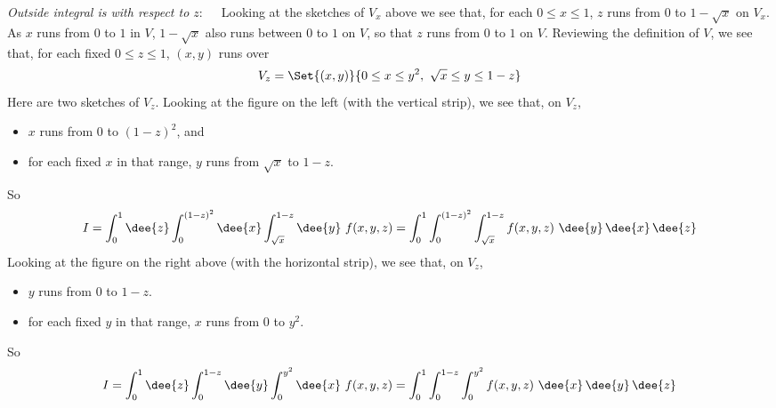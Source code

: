 \begin{solution}
\emph{Outside integral is with respect to $z$}:\ \ \ 
Looking at the sketches of $V_x$ above we see that, for each $0\le x\le 1$,
$z$ runs from $0$ to $1-\sqrt{x}$ on $V_x$. As $x$ runs from $0$ to $1$ in
$V$, $1-\sqrt{x}$ also runs between $0$ to $1$ on $V$, so that $z$ 
runs from $0$ to $1$ on $V$.
Reviewing the definition of $V$, we see that,
for each fixed $0\le z\le 1$, $(x,y)$ runs over
\begin{equation*}
V_z= \Set{(x,y)}{0\le x\le y^2,\ \sqrt{x}\le y\le 1-z}
\end{equation*} 
Here are two sketches of $V_z$.
Looking at the figure on the left (with the vertical strip), we see that, 
on $V_z$,
\begin{itemize}
\item 
$x$ runs from $0$ to $(1-z)^2$, and
\item 
for each fixed $x$ in that range,
$y$ runs from $\sqrt{x}$ to $1-z$.
\end{itemize}
So
\begin{equation*}
I = \int_0^1 \dee{z} \int_0^{(1-z)^2}\dee{x} \int_{\sqrt{x}}^{1-z}\dee{y}\ f(x,y,z)
  = \int_0^1  \int_0^{(1-z)^2} \int_{\sqrt{x}}^{1-z}f(x,y,z)\ 
                   \dee{y}\,\dee{x}\, \dee{z}
\end{equation*}
Looking at the figure on the right above (with the horizontal strip), 
we see that, on $V_z$,
\begin{itemize}
\item 
$y$ runs from $0$ to $1-z$.
\item 
for each fixed $y$ in that range,
$x$ runs from $0$ to $y^2$.
\end{itemize}
So
\begin{equation*}
I = \int_0^1 \dee{z} \int_0^{1-z}\dee{y} \int_0^{y^2}\dee{x}\ f(x,y,z)
  = \int_0^1  \int_0^{1-z} \int_0^{y^2} f(x,y,z)\ 
                   \dee{x}\, \dee{y}\,\dee{z}
\end{equation*}
\bigskip


\end{solution}
